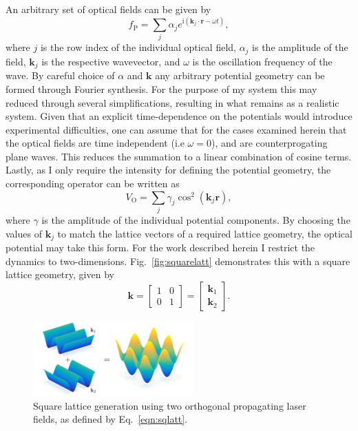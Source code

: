 An arbitrary set of optical fields can be given by
\begin{equation}\label{eqn:optfield}
    f_{\textrm{P}} = \displaystyle\sum\limits_{j} \alpha_j e^{\textrm{i}\left(\mathbf{k}_j\cdot\mathbf{r} - \omega t\right)},
\end{equation}
where $j$ is the row index of the individual optical field, $\alpha_j$ is the amplitude of the field, $\mathbf{k}_j$ is the respective wavevector, and $\omega$ is the oscillation frequency of the wave. By careful choice of $\alpha$ and $\mathbf{k}$ any arbitrary potential geometry can be formed through Fourier synthesis. For the purpose of my system this may reduced through several simplifications, resulting in what remains as a realistic system. Given that an explicit time-dependence on the potentials would introduce experimental difficulties, one can assume that for the cases examined herein that the optical fields are time independent (i.e $\omega=0$), and are counterprogating plane waves. This reduces the summation to a linear combination of cosine terms. Lastly, as I only require the intensity for defining the potential geometry, the corresponding operator can be written as
\begin{equation}\label{eqn:vopt}
    V_{\textrm{O}} = \displaystyle\sum\limits_{j} \gamma_j \cos^2 \left(\mathbf{k}_j \mathbf{r}\right),
\end{equation}
where $\gamma$ is the amplitude of the individual potential components. By choosing the values of $\mathbf{k}_j$ to match the lattice vectors of a required lattice geometry, the optical potential may take this form. For the work described herein I restrict the dynamics to two-dimensions. Fig.~\ref{fig:squarelatt} demonstrates this with a square lattice geometry, given by
\begin{equation}\label{eqn:sqlatt}
    \mathbf{k} =
    \begin{bmatrix}
     1 & 0 \\
     0 & 1
    \end{bmatrix} =
    \begin{bmatrix}
     \mathbf{k}_1  \\
     \mathbf{k}_2
    \end{bmatrix}.
\end{equation}

\begin{figure}\centering
    \includegraphics[width=0.55\textwidth]{./Images/ch4_vtx/VOPT/squarelatt}
    \caption{Square lattice generation using two orthogonal propagating laser fields, as defined by Eq.~\ref{eqn:sqlatt}.}\label{fig:cos2xy}
\end{figure}

